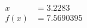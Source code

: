 \documentclass[preview]{standalone}
\begin{document}
\begin{align*}
x &= 3.2283\\f(x) &= 7.5690395
\end{align*}
\end{document}
